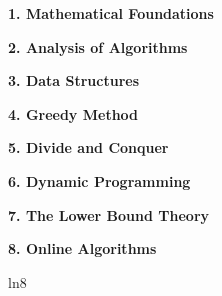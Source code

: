 \documentclass[8pt]{minimal}
\begin{document}
\begin{flushleft}
\begin{multicols}{3}


    \textbf{1. Mathematical Foundations}
    

    \textbf{2. Analysis of Algorithms}
    

    \textbf{3. Data Structures}

    
    \textbf{4. Greedy Method}
    


    \textbf{5. Divide and Conquer}

    


    \textbf{6. Dynamic Programming}
    

    \textbf{7. The Lower Bound Theory}

    


    \textbf{8. Online Algorithms}

    ln8
    

\end{multicols}
\end{flushleft}
\end{document}
